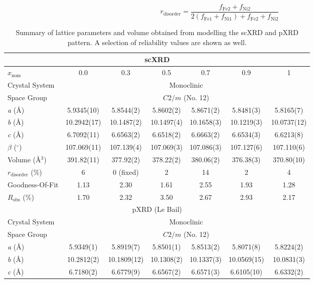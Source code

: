 \documentclass[twocolumn,superscriptaddress,prb,preprintnumbers,nobibnotes,aps]{revtex4-2}  %
\begin{document}
\begin{equation}
r_\textrm{disorder} = \dfrac{f_\textrm{Fe2} + f_\textrm{Ni2}}{2(f_\textrm{Fe1} + f_\textrm{Ni1}) + f_\textrm{Fe2} + f_\textrm{Ni2}}
\label{eq:disorder_ratio}
\end{equation}

\begin{table*}[tb]
\centering
\caption{
Summary of lattice parameters and volume obtained from modelling the scXRD and pXRD pattern. A selection of reliability values are shown as well.
}
\begin{tabular}{lcccccc}
\hline \hline
\multicolumn{7}{c}{scXRD} \\
\hline
 $x_{\textrm{nom}}$ & 0.0 & 0.3 & 0.5 & 0.7 & 0.9 & 1 \\
\hline
Crystal System & \multicolumn{6}{c}{Monoclinic} \\
Space Group & \multicolumn{6}{c}{$C2/m$ (No. 12)} \\
\textit{a} (\r{A}) & 5.9345(10) & 5.8544(2) & 5.8602(2) & 5.8671(2) & 5.8481(3) & 5.8165(7) \\
\textit{b} (\r{A}) & 10.2942(17) & 10.1487(2) & 10.1497(4) & 10.1658(3) & 10.1219(3) & 10.0737(12) \\
\textit{c} (\r{A}) & 6.7092(11) & 6.6563(2) & 6.6518(2) & 6.6663(2) & 6.6534(3) & 6.6213(8) \\
$\beta$ ($^\circ$) & 107.069(11) & 107.139(4) & 107.069(3) & 107.086(3) & 107.127(6) & 107.110(6) \\
Volume (\r{A}$^3$) & 391.82(11) & 377.92(2) & 378.22(2) & 380.06(2) & 376.38(3) & 370.80(10) \\
$r_\textrm{disorder}$ (\%) & 6 & 0 (fixed) & 2 & 14 & 2 & 4 \\
Goodness-Of-Fit & 1.13 & 2.30 & 1.61 & 2.55 & 1.93 & 1.28 \\
$R_\textrm{obs}$ (\%) & 1.70 & 2.32 & 3.50 & 2.67 & 2.93 & 2.17 \\
\hline
\multicolumn{7}{c}{pXRD (Le Bail)} \\
\hline
Crystal System & \multicolumn{6}{c}{Monoclinic} \\
Space Group & \multicolumn{6}{c}{$C2/m$ (No. 12)} \\
\textit{a} (\r{A}) & 5.9349(1) & 5.8919(7) & 5.8501(1) & 5.8513(2) & 5.8071(8) & 5.8224(2) \\
\textit{b} (\r{A}) & 10.2812(2) & 10.1809(12) & 10.1308(2) & 10.1337(3) & 10.0569(15) & 10.0831(3) \\
\textit{c} (\r{A}) & 6.7180(2) & 6.6779(9) & 6.6567(2) & 6.6571(3) & 6.6105(10) & 6.6332(2) \\

\end{tabular}
\end{table*}
\end{document}

